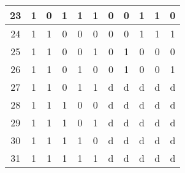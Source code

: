 \documentclass{article}
\begin{document}
\begin{center}
\begin{tabular}{|c|c|cccc|ccccc|}
    23 & 1 & 0 & 1 & 1 & 1 & 0 & 0 & 1 & 1 & 0 \\ \hline
    24 & 1 & 1 & 0 & 0 & 0 & 0 & 0 & 1 & 1 & 1 \\ \hline
    25 & 1 & 1 & 0 & 0 & 1 & 0 & 1 & 0 & 0 & 0 \\ \hline
    26 & 1 & 1 & 0 & 1 & 0 & 0 & 1 & 0 & 0 & 1 \\ \hline
    27 & 1 & 1 & 0 & 1 & 1 & d & d & d & d & d \\ \hline
    28 & 1 & 1 & 1 & 0 & 0 & d & d & d & d & d \\ \hline
    29 & 1 & 1 & 1 & 0 & 1 & d & d & d & d & d \\ \hline
    30 & 1 & 1 & 1 & 1 & 0 & d & d & d & d & d \\ \hline
    31 & 1 & 1 & 1 & 1 & 1 & d & d & d & d & d \\ \hline
\end{tabular}\end{center}
\newpage
\end{document}

